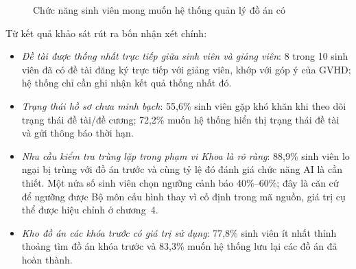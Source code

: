 \documentclass[../main.tex]{subfiles}
\begin{document}
\begin{figure}[H]
\centering
{}
\caption{Chức năng sinh viên mong muốn hệ thống quản lý đồ án có}
\label{fig:c2-ks-chuc-nang}
\end{figure}

Từ kết quả khảo sát rút ra bốn nhận xét chính:
\begin{itemize}
    \item \textit{Đề tài được thống nhất trực tiếp giữa sinh viên và giảng viên}: 8 trong 10 sinh viên đã có đề tài đăng ký trực tiếp với giảng viên, khớp với góp ý của GVHD; hệ thống chỉ cần ghi nhận kết quả thống nhất đó.
    \item \textit{Trạng thái hồ sơ chưa minh bạch}: 55,6\% sinh viên gặp khó khăn khi theo dõi trạng thái đề tài/đề cương; 72,2\% muốn hệ thống hiển thị trạng thái đề tài và gửi thông báo thời hạn.
    \item \textit{Nhu cầu kiểm tra trùng lặp trong phạm vi Khoa là rõ ràng}: 88,9\% sinh viên lo ngại bị trùng với đồ án trước và cùng tỷ lệ đó đánh giá chức năng AI là cần thiết. Một nửa số sinh viên chọn ngưỡng cảnh báo 40\%--60\%; đây là căn cứ để ngưỡng được Bộ môn cấu hình thay vì cố định trong mã nguồn, giá trị cụ thể được hiệu chỉnh ở chương~4.
    \item \textit{Kho đồ án các khóa trước có giá trị sử dụng}: 77,8\% sinh viên ít nhất thỉnh thoảng tìm đồ án khóa trước và 83,3\% muốn hệ thống lưu lại các đồ án đã hoàn thành.
\end{itemize}
\end{document}
